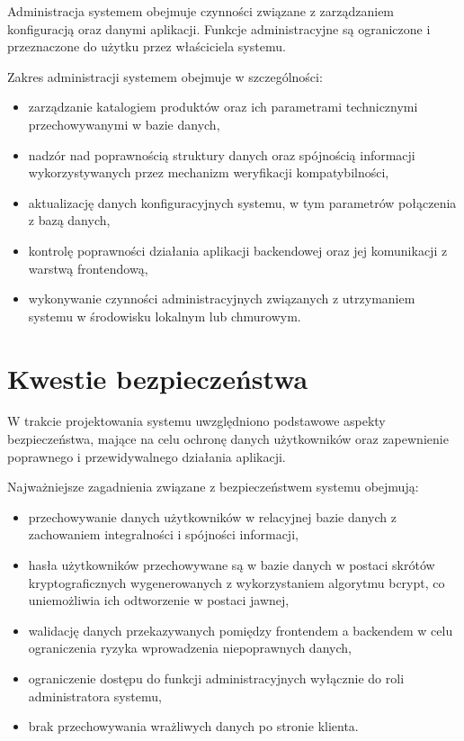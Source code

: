\documentclass[a4paper,twoside,12pt]{book}
\begin{document}
Administracja systemem obejmuje czynności związane z zarządzaniem konfiguracją
oraz danymi aplikacji. Funkcje administracyjne są ograniczone i przeznaczone do
użytku przez właściciela systemu.

Zakres administracji systemem obejmuje w szczególności:

\begin{itemize}
    \item zarządzanie katalogiem produktów oraz ich parametrami technicznymi
    przechowywanymi w bazie danych,

    \item nadzór nad poprawnością struktury danych oraz spójnością informacji
    wykorzystywanych przez mechanizm weryfikacji kompatybilności,

    \item aktualizację danych konfiguracyjnych systemu, w tym parametrów
    połączenia z bazą danych,

    \item kontrolę poprawności działania aplikacji backendowej oraz jej
    komunikacji z warstwą frontendową,

    \item wykonywanie czynności administracyjnych związanych z utrzymaniem
    systemu w środowisku lokalnym lub chmurowym.
\end{itemize}

\section{Kwestie bezpieczeństwa}

W trakcie projektowania systemu uwzględniono podstawowe aspekty bezpieczeństwa,
mające na celu ochronę danych użytkowników oraz zapewnienie poprawnego i
przewidywalnego działania aplikacji.

Najważniejsze zagadnienia związane z bezpieczeństwem systemu obejmują:

\begin{itemize}
    \item przechowywanie danych użytkowników w relacyjnej bazie danych z
    zachowaniem integralności i spójności informacji,

    \item hasła użytkowników przechowywane są w bazie danych w postaci skrótów
    kryptograficznych wygenerowanych z wykorzystaniem algorytmu bcrypt, co
    uniemożliwia ich odtworzenie w postaci jawnej,

    \item walidację danych przekazywanych pomiędzy frontendem a backendem w celu
    ograniczenia ryzyka wprowadzenia niepoprawnych danych,

    \item ograniczenie dostępu do funkcji administracyjnych wyłącznie do roli
    administratora systemu,

    \item brak przechowywania wrażliwych danych po stronie klienta.
\end{itemize}
\end{document}

